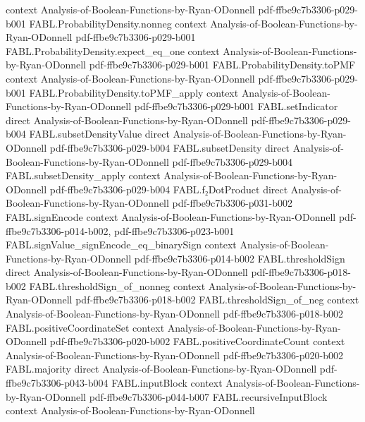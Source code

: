 \begin{theorem}
  {context}
  {Analysis-of-Boolean-Functions-by-Ryan-ODonnell}
  {pdf-ffbe9c7b3306-p029-b001}
\proofstep
  {FABL.ProbabilityDensity.nonneg}
  {context}
  {Analysis-of-Boolean-Functions-by-Ryan-ODonnell}
  {pdf-ffbe9c7b3306-p029-b001}
\proofstep
  {FABL.ProbabilityDensity.expect_eq_one}
  {context}
  {Analysis-of-Boolean-Functions-by-Ryan-ODonnell}
  {pdf-ffbe9c7b3306-p029-b001}
\proofstep
  {FABL.ProbabilityDensity.toPMF}
  {context}
  {Analysis-of-Boolean-Functions-by-Ryan-ODonnell}
  {pdf-ffbe9c7b3306-p029-b001}
\proofstep
  {FABL.ProbabilityDensity.toPMF_apply}
  {context}
  {Analysis-of-Boolean-Functions-by-Ryan-ODonnell}
  {pdf-ffbe9c7b3306-p029-b001}
\proofstep
  {FABL.setIndicator}
  {direct}
  {Analysis-of-Boolean-Functions-by-Ryan-ODonnell}
  {pdf-ffbe9c7b3306-p029-b004}
\proofstep
  {FABL.subsetDensityValue}
  {direct}
  {Analysis-of-Boolean-Functions-by-Ryan-ODonnell}
  {pdf-ffbe9c7b3306-p029-b004}
\proofstep
  {FABL.subsetDensity}
  {direct}
  {Analysis-of-Boolean-Functions-by-Ryan-ODonnell}
  {pdf-ffbe9c7b3306-p029-b004}
\proofstep
  {FABL.subsetDensity_apply}
  {context}
  {Analysis-of-Boolean-Functions-by-Ryan-ODonnell}
  {pdf-ffbe9c7b3306-p029-b004}
\proofstep
  {FABL.f₂DotProduct}
  {direct}
  {Analysis-of-Boolean-Functions-by-Ryan-ODonnell}
  {pdf-ffbe9c7b3306-p031-b002}
\proofstep
  {FABL.signEncode}
  {context}
  {Analysis-of-Boolean-Functions-by-Ryan-ODonnell}
  {pdf-ffbe9c7b3306-p014-b002,
    pdf-ffbe9c7b3306-p023-b001}
\proofstep
  {FABL.signValue_signEncode_eq_binarySign}
  {context}
  {Analysis-of-Boolean-Functions-by-Ryan-ODonnell}
  {pdf-ffbe9c7b3306-p014-b002}
\proofstep
  {FABL.thresholdSign}
  {direct}
  {Analysis-of-Boolean-Functions-by-Ryan-ODonnell}
  {pdf-ffbe9c7b3306-p018-b002}
\proofstep
  {FABL.thresholdSign_of_nonneg}
  {context}
  {Analysis-of-Boolean-Functions-by-Ryan-ODonnell}
  {pdf-ffbe9c7b3306-p018-b002}
\proofstep
  {FABL.thresholdSign_of_neg}
  {context}
  {Analysis-of-Boolean-Functions-by-Ryan-ODonnell}
  {pdf-ffbe9c7b3306-p018-b002}
\proofstep
  {FABL.positiveCoordinateSet}
  {context}
  {Analysis-of-Boolean-Functions-by-Ryan-ODonnell}
  {pdf-ffbe9c7b3306-p020-b002}
\proofstep
  {FABL.positiveCoordinateCount}
  {context}
  {Analysis-of-Boolean-Functions-by-Ryan-ODonnell}
  {pdf-ffbe9c7b3306-p020-b002}
\proofstep
  {FABL.majority}
  {direct}
  {Analysis-of-Boolean-Functions-by-Ryan-ODonnell}
  {pdf-ffbe9c7b3306-p043-b004}
\proofstep
  {FABL.inputBlock}
  {context}
  {Analysis-of-Boolean-Functions-by-Ryan-ODonnell}
  {pdf-ffbe9c7b3306-p044-b007}
\proofstep
  {FABL.recursiveInputBlock}
  {context}
  {Analysis-of-Boolean-Functions-by-Ryan-ODonnell}

\end{theorem}
